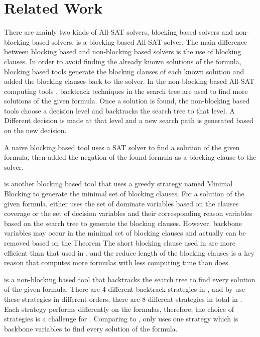 \section{Related Work} \label{sec:rela}
There are mainly two kinds of All-SAT solvers, blocking based solvers and non-blocking based solvers.
\tool is a blocking based All-SAT solver.
The main difference between blocking based and non-blocking based solvers is the use of blocking clauses.
In order to avoid finding the already known solutions of the formula, blocking based tools generate the blocking clauses of each known solution and added the blocking clauses back to the solver.
In the non-blocking based All-SAT computing tools \cite{zhao2009asig} \cite{grumberg2004memory} \cite{jabbour2014extending} \cite{ietool}, backtrack techniques in the search tree are used to find more solutions of the given formula. Once a solution is found, the non-blocking based tools choose a decision level and backtracks the search tree to that level. A Different decision is made at that level and a new search path is generated based on the new decision.

A naive blocking based tool \cite{mcmillan2002applying} uses a SAT solver to find a solution of the given formula, then added the negation of the found formula as a blocking clause to the solver.

\ctool\cite{ctool} is another blocking based tool that uses a greedy strategy named Minimal Blocking to generate the minimal set of blocking clauses.
For a solution of the given formula, \ctool either uses the set of dominate variables based on the clauses coverage or the set of decision variables and their corresponding reason variables based on the search tree to generate the blocking clauses.
However, backbone variables may occur in the minimal set of blocking clauses and actually can be removed based on the Theorem \cite{theo:bl}
The short blocking clause used in \tool are more efficient than that used in \ctool, and the reduce length of the blocking clauses is a key reason that \tool computes more formulas with less computing time than \ctool does.

\nbc\cite{ietool} is a non-blocking based tool that backtracks the search tree to find every solution of the given formula. There are 4 different backtrack strategies in \nbc, and by use these strategies in different orders, there are 8 different strategies in total in \nbc. Each strategy performs differently on the formulas, therefore, the choice of strategies is a challenge for \nbc. 
Comparing to \nbc, \tool only uses one strategy which is backbone variables to find every solution of the formula.

